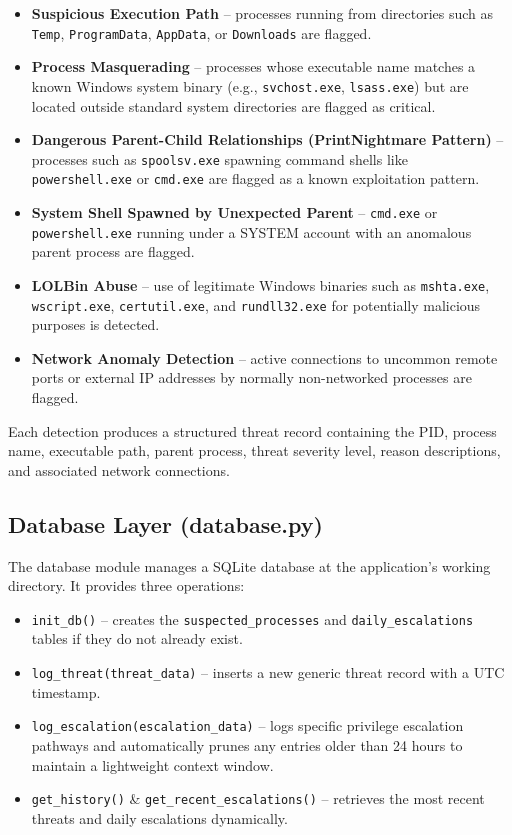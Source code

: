 \begin{itemize}
    \item \textbf{Suspicious Execution Path} -- processes running from directories such as \texttt{Temp}, \texttt{ProgramData}, \texttt{AppData}, or \texttt{Downloads} are flagged.
    \item \textbf{Process Masquerading} -- processes whose executable name matches a known Windows system binary (e.g., \texttt{svchost.exe}, \texttt{lsass.exe}) but are located outside standard system directories are flagged as critical.
    \item \textbf{Dangerous Parent-Child Relationships (PrintNightmare Pattern)} -- processes such as \texttt{spoolsv.exe} spawning command shells like \texttt{powershell.exe} or \texttt{cmd.exe} are flagged as a known exploitation pattern.
    \item \textbf{System Shell Spawned by Unexpected Parent} -- \texttt{cmd.exe} or \texttt{powershell.exe} running under a SYSTEM account with an anomalous parent process are flagged.
    \item \textbf{LOLBin Abuse} -- use of legitimate Windows binaries such as \texttt{mshta.exe}, \texttt{wscript.exe}, \texttt{certutil.exe}, and \texttt{rundll32.exe} for potentially malicious purposes is detected.
    \item \textbf{Network Anomaly Detection} -- active connections to uncommon remote ports or external IP addresses by normally non-networked processes are flagged.
\end{itemize}

Each detection produces a structured threat record containing the PID, process name, executable path, parent process, threat severity level, reason descriptions, and associated network connections.

\subsection{Database Layer (database.py)}

The database module manages a SQLite database at the application's working directory. It provides three operations:

\begin{itemize}
    \item \texttt{init\_db()} -- creates the \texttt{suspected\_processes} and \texttt{daily\_escalations} tables if they do not already exist.
    \item \texttt{log\_threat(threat\_data)} -- inserts a new generic threat record with a UTC timestamp.
    \item \texttt{log\_escalation(escalation\_data)} -- logs specific privilege escalation pathways and automatically prunes any entries older than 24 hours to maintain a lightweight context window.
    \item \texttt{get\_history()} \& \texttt{get\_recent\_escalations()} -- retrieves the most recent threats and daily escalations dynamically.
\end{itemize}

